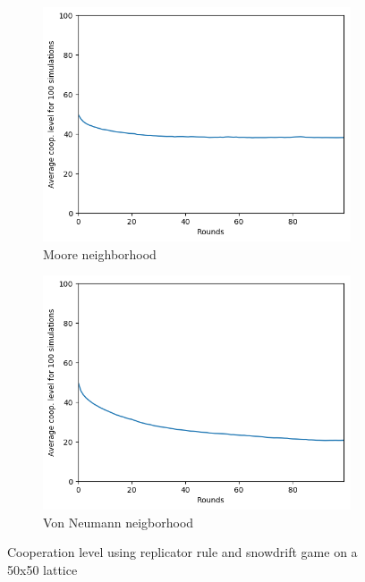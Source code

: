 \documentclass[letterpaper]{article}
\begin{document}
\begin{figure}
    \begin{subfigure}{.5\textwidth}
        \centering
        \includegraphics[width=1\linewidth]{images/assign2/50-part2}
        \caption{Moore neighborhood}
        \label{fig:50moorepart2}
    \end{subfigure}
    \begin{subfigure}{.5\textwidth}
        \centering
        \includegraphics[width=1\linewidth]{images/assign2/50_vonneumann-part2}
        \caption{Von Neumann neigborhood}
        \label{fig:50vonpart2}
    \end{subfigure}
    \caption{Cooperation level using replicator rule and
    snowdrift game on a 50x50 lattice}
    \label{fig:50part2}
\end{figure}
\end{document}
